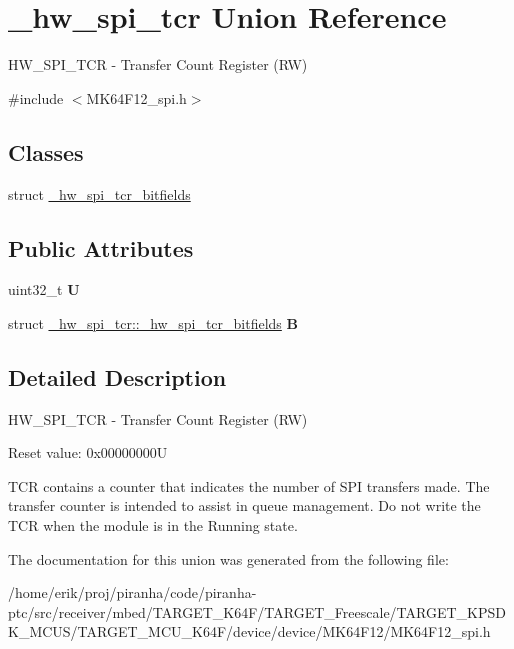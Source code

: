 \hypertarget{union__hw__spi__tcr}{}\section{\+\_\+hw\+\_\+spi\+\_\+tcr Union Reference}
\label{union__hw__spi__tcr}


H\+W\+\_\+\+S\+P\+I\+\_\+\+T\+CR -\/ Transfer Count Register (RW)  




{\ttfamily \#include $<$M\+K64\+F12\+\_\+spi.\+h$>$}

\subsection*{Classes}
\begin{DoxyCompactItemize}
\item 
struct \hyperlink{struct__hw__spi__tcr_1_1__hw__spi__tcr__bitfields}{\+\_\+hw\+\_\+spi\+\_\+tcr\+\_\+bitfields}
\end{DoxyCompactItemize}
\subsection*{Public Attributes}
\begin{DoxyCompactItemize}
\item 
uint32\+\_\+t {\bfseries U}\hypertarget{union__hw__spi__tcr_a1017337e42df6b02a7c00a00a434b354}{}\label{union__hw__spi__tcr_a1017337e42df6b02a7c00a00a434b354}

\item 
struct \hyperlink{struct__hw__spi__tcr_1_1__hw__spi__tcr__bitfields}{\+\_\+hw\+\_\+spi\+\_\+tcr\+::\+\_\+hw\+\_\+spi\+\_\+tcr\+\_\+bitfields} {\bfseries B}\hypertarget{union__hw__spi__tcr_a65f76d90fc969c9ab2c6bcae0cd4ab69}{}\label{union__hw__spi__tcr_a65f76d90fc969c9ab2c6bcae0cd4ab69}

\end{DoxyCompactItemize}


\subsection{Detailed Description}
H\+W\+\_\+\+S\+P\+I\+\_\+\+T\+CR -\/ Transfer Count Register (RW) 

Reset value\+: 0x00000000U

T\+CR contains a counter that indicates the number of S\+PI transfers made. The transfer counter is intended to assist in queue management. Do not write the T\+CR when the module is in the Running state. 

The documentation for this union was generated from the following file\+:\begin{DoxyCompactItemize}
\item 
/home/erik/proj/piranha/code/piranha-\/ptc/src/receiver/mbed/\+T\+A\+R\+G\+E\+T\+\_\+\+K64\+F/\+T\+A\+R\+G\+E\+T\+\_\+\+Freescale/\+T\+A\+R\+G\+E\+T\+\_\+\+K\+P\+S\+D\+K\+\_\+\+M\+C\+U\+S/\+T\+A\+R\+G\+E\+T\+\_\+\+M\+C\+U\+\_\+\+K64\+F/device/device/\+M\+K64\+F12/M\+K64\+F12\+\_\+spi.\+h\end{DoxyCompactItemize}
